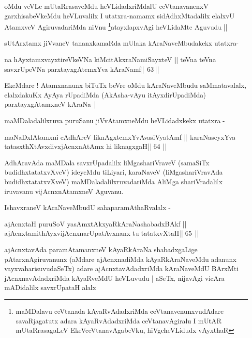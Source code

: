 \begin{artha}
oMdu veVLe mUtaRrasaveMdu heVLidadxriMdalU ceVtanavanenxV
garxhisabeVkeMdu heVLuvalilx I utatxra-namamx sidAdhxMtadalilx elalxvU
AtamxveV AgiruvadariMda niVnu \footnote{maMDalavu ceVtanada
kAyaRvAdadxriMda ceVtanavenunxvudAdare savaRjagatutx adara
kAyaRvAdadxriMda ceVtanavAgiralu I mUtAR mUtaRrasagaLeV
EkeVceVtanavAgabeVku, hiVgeheVLidudx vAyxthaR}atayxlapxvAgi heVLidaMte
Aguvudu ||

sUtArxtamx jiVvaneV tananxkamaRda mUlaka kAraNaveMbudakekx utatxra-
\end{artha}

\begin{shl}
na hAyxtamxvayxtireVkeVNa kiMcitAkxraNamiSayxteV ||
teVna teVna savxrUpeVNa parxtayxgAtemxYva kAraNamf\hfill || 63 ||
\end{shl}

\begin{artha}
EkeMdare ! Atamxnanunx biTuTx beVre oMdu kAraNaveMbudu saMmatavalalx,
elalxdakuKx AyAya rUpadiMda (AkAsha-vAyu itAyxdirUpadiMda)
parxtayxgAtamxneV kAraNa ||

maMDaladalilxruva puruSanu jiVvAtamxneMdu heVLidadxkekx utatxra -
\end{artha}

\begin{shl}
maNaDxlAtamxni cA\s\s dhAreV liknAgxtemxYvAvasiVyatAmf ||
karaNaseyxYva tatasxthXtAvxdivxjAcnxnAtAmx hi liknagxgaH\hfill || 64 ||
\end{shl}

\begin{artha}
AdhAravAda maMDala savxrUpadalilx liMgashariVraveV (samaSiTx
budidhxtatatxvXveV) ideyeMdu tiLiyari, karaNaveV (liMgashariVravAda
budidhxtatatxvXveV) maMDaladalilxruvadariMda AliMga shariVradalilx
iruvavanu vijAcnxnAtamxneV Aguvanu.

IshavxraneV kAraNaveMbudU sahaparamAthaRvalalx -
\end{artha}

\begin{shl}
ajAcnxtaH puruSoV yasAmxtAkxyaRkAraNashabadxBAkf ||
ajAcnxtamithAyxvijAcnxnarUpatAvxnanx tu tatatxvXtaH\hfill || 65 ||
\end{shl}

\begin{artha}
ajAcnxtavAda paramAtamanxneV kAyaRkAraNa shabadxgaLige
pAtarxnAgiruvanunx (aMdare ajAcnxnadiMda kAyaRkAraNaveMdu adanunx
vayxvaharisuvudaSeTx) adare ajAcnxtavAdadxriMda kAraNaveMdU BArxMti
jAcnxnavAdadxriMda kAyaRveMdU heVLuvudu | aSeTx, nijavAgi vicAra
mADidalilx savxrUpataH alalx 
\end{artha}
